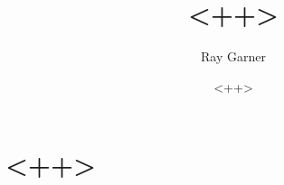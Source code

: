\documentclass{article}
\title{<++>}
\date{<++>}
\author{Ray Garner}
\begin{document}
\maketitle
\thispagestyle{empty}
\tableofcontents
\newpage

\section{<++>}

\printbibliography

\paragraph{}

\end{document}

